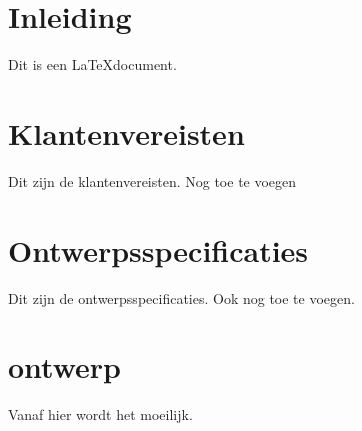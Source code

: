 \documentclass{article}
\begin{document}
\section{Inleiding}

Dit is een \LaTeX document.

\section{Klantenvereisten}

Dit zijn de klantenvereisten.
Nog toe te voegen

\section{Ontwerpsspecificaties}

Dit zijn de ontwerpsspecificaties.
Ook nog toe te voegen.

\section{ontwerp}

Vanaf hier wordt het moeilijk.
\end{document}
